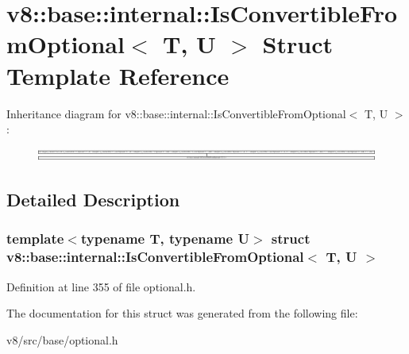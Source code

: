 \hypertarget{structv8_1_1base_1_1internal_1_1IsConvertibleFromOptional}{}\section{v8\+:\+:base\+:\+:internal\+:\+:Is\+Convertible\+From\+Optional$<$ T, U $>$ Struct Template Reference}
\label{structv8_1_1base_1_1internal_1_1IsConvertibleFromOptional}
Inheritance diagram for v8\+:\+:base\+:\+:internal\+:\+:Is\+Convertible\+From\+Optional$<$ T, U $>$\+:\begin{figure}[H]
\begin{center}
\leavevmode
\includegraphics[height=0.431267cm]{structv8_1_1base_1_1internal_1_1IsConvertibleFromOptional}
\end{center}
\end{figure}


\subsection{Detailed Description}
\subsubsection*{template$<$typename T, typename U$>$\newline
struct v8\+::base\+::internal\+::\+Is\+Convertible\+From\+Optional$<$ T, U $>$}



Definition at line 355 of file optional.\+h.



The documentation for this struct was generated from the following file\+:\begin{DoxyCompactItemize}
\item 
v8/src/base/optional.\+h\end{DoxyCompactItemize}
